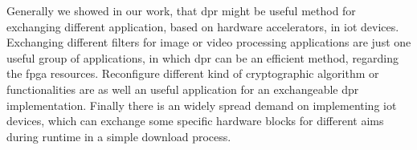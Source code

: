 Generally we showed in our work, that \gls{dpr} might be useful method for exchanging different application, based on hardware accelerators, in \gls{iot} devices. Exchanging different filters for image or video processing applications are just one useful group of applications, in which \gls{dpr} can be an efficient method, regarding the \gls{fpga} resources.  Reconfigure different kind of cryptographic algorithm or functionalities are as well an useful application for an exchangeable \gls{dpr} implementation. Finally there is an widely spread demand on implementing \gls{iot} devices, which can exchange some specific hardware blocks for different aims during runtime in a simple download process.